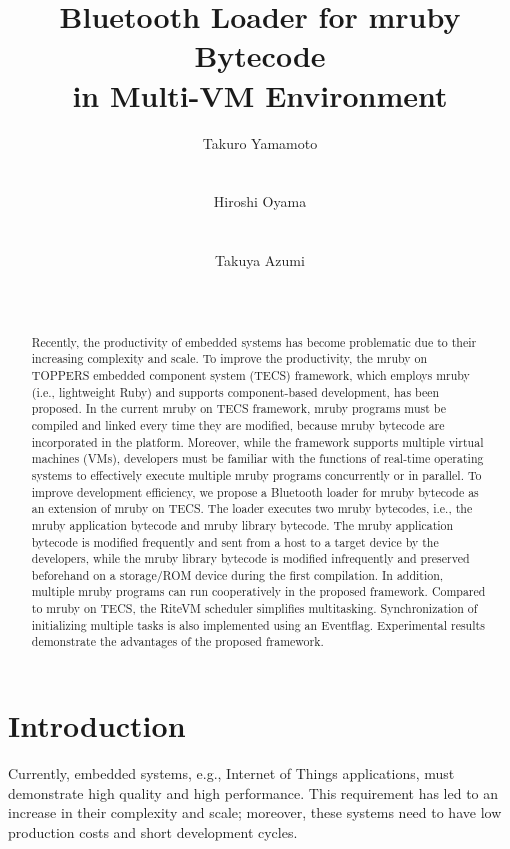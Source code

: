\documentclass{sig-alternate-05-2015}
\title{Bluetooth Loader for mruby Bytecode \\ in Multi-VM Environment}
\author{
\alignauthor
Takuro Yamamoto\\
    \affaddr{Graduate School of Engineering Science, Osaka University}\\
    \affaddr{Osaka, JAPAN}\\
\alignauthor
Hiroshi Oyama\\
    \affaddr{OKUMA Corporation}\\
    \affaddr{Aichi, JAPAN}\\
\alignauthor
Takuya Azumi\\
    \affaddr{Graduate School of Engineering Science, Osaka University}\\
    \affaddr{Osaka, JAPAN}\\
}
\begin{document}
\maketitle
\begin{abstract}
Recently, the productivity of embedded systems has become problematic due to their increasing complexity and scale.
To improve the productivity, the mruby on TOPPERS embedded component system (TECS) framework, which employs mruby (i.e., lightweight Ruby) and supports component-based development, has been proposed.
In the current mruby on TECS framework, mruby programs must be compiled and linked every time they are modified, because mruby bytecode are incorporated in the platform.
Moreover, while the framework supports multiple virtual machines (VMs), developers must be familiar with the functions of real-time operating systems to effectively execute multiple mruby programs concurrently or in parallel.
To improve development efficiency, we propose a Bluetooth loader for mruby bytecode as an extension of mruby on TECS.
The loader executes two mruby bytecodes, i.e., the mruby application bytecode and mruby library bytecode.
The mruby application bytecode is modified frequently and sent from a host to a target device by the developers, while the mruby library bytecode is modified infrequently and preserved beforehand on a storage/ROM device during the first compilation.
In addition, multiple mruby programs can run cooperatively in the proposed framework.
Compared to mruby on TECS, the RiteVM scheduler simplifies multitasking.
Synchronization of initializing multiple tasks is also implemented using an Eventflag. 
Experimental results demonstrate the advantages of the proposed framework.
\end{abstract}

\section{Introduction}
Currently, embedded systems, e.g., Internet of Things applications, must demonstrate high quality and high performance.
This requirement has led to an increase in their complexity and scale; moreover, these systems need to have low production costs and short development cycles.
\end{document}
